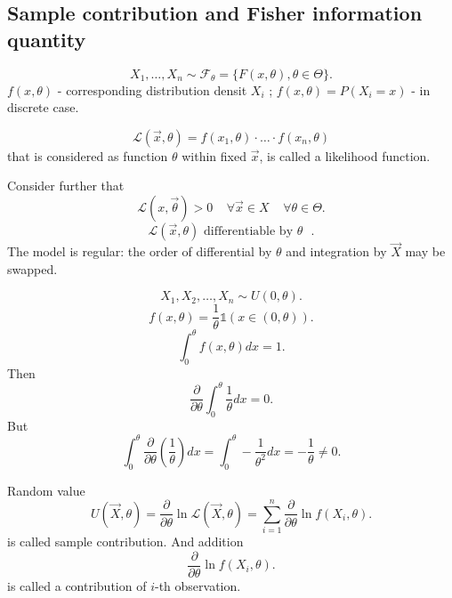 \subsection{Sample contribution and Fisher information quantity}

\[
X_{1}, \ldots, X_{n} \sim \mathcal{F}_{\theta} = 
\{ F(x, \theta), \theta \in \Theta \} 
.\] 
$f(x, \theta)$ - corresponding distribution densit  $X_{i}$ ;
$f(x, \theta) = P\left( X_{i} = x \right) $ - in discrete case.

\begin{definition}
    \[
    \mathcal{L} (\vec{x}, \theta) = f(x_1, \theta) \cdot
    \ldots \cdot f(x_n, \theta)
    \] that is considered as function $\theta$ within fixed $\vec{x}$,
    is called a likelihood function.
\end{definition}

Consider further that
\[
\mathcal{L} (x, \vec{\theta}) > 0 \;\;\;\; \forall \vec{x} \in X \;\;\;\;
\forall \theta \in \Theta
.\] 
\[
\mathcal{L}(\vec{x}, \theta) \text{ differentiable by $\theta$ }
.\]
The model is regular: the order of differential by $\theta$ and integration by $\vec{X}$ may be swapped.

\begin{example}
    \[
    X_1, X_2, \ldots , X_n \sim  U(0, \theta)
    .\] 
    \[
    f(x, \theta) = \frac{1}{\theta} \mathds{1}(x \in (0, \theta))
    .\] 
    \[
    \int_{0}^{\theta} f(x, \theta) dx = 1 
    .\] 
    Then \[
    \frac{\partial}{\partial \theta} \int_{0}^{\theta} \frac{1}{\theta} dx = 0 
    .\] 
    But \[
    \int_{0}^{\theta} \frac{\partial }{\partial \theta} \left( \frac{1}{\theta} \right) dx = \int_{0}^{\theta} - \frac{1}{\theta^2}dx = - \frac{1}{\theta} \not= 0 
    .\] 
\end{example}

\begin{definition}
    Random value 
    \[
    U(\vec{X}, \theta) =
    \frac{\partial}{\partial \theta} \ln \mathcal{L}(\vec{X}, \theta) =
    \sum_{i=1}^{n} \frac{\partial }{\partial \theta} \ln f(X_i, \theta)
    .\] is called sample contribution. And addition
    \[
    \frac{\partial }{\partial \theta} \ln f(X_i, \theta)
    .\] is called a contribution of $i$-th observation.
\end{definition}

